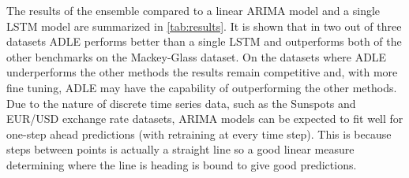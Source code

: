 \documentclass{article}
\begin{document}
The results of the ensemble compared to a linear ARIMA model and a single LSTM model are summarized in \autoref{tab:results}. It is shown that in two out of three datasets ADLE performs better than a single LSTM and outperforms both of the other benchmarks on the Mackey-Glass dataset. On the datasets where ADLE underperforms the other methods the results remain competitive and, with more fine tuning, ADLE may have the capability of outperforming the other methods. Due to the nature of discrete time series data, such as the Sunspots and EUR/USD exchange rate datasets, ARIMA models can be expected to fit well for one-step ahead predictions (with retraining at every time step). This is because steps between points is actually a straight line so a good linear measure determining where the line is heading is bound to give good predictions.


\end{document}
